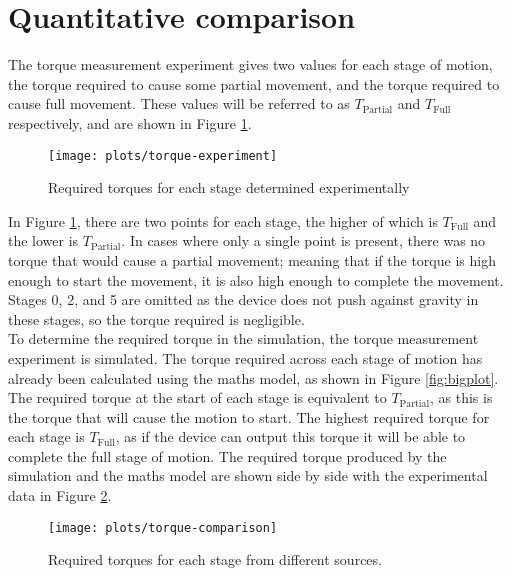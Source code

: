 \section{Quantitative comparison}

The torque measurement experiment gives two values for each stage of motion, the torque required to cause some partial movement, and the torque required to cause full movement. These values will be referred to as $T_\mathrm{Partial}$ and $T_\mathrm{Full}$ respectively, and are shown in Figure \ref{fig:torque-experiment}.

\begin{figure}[!h]
	\centering
	\texttt{[image: plots/torque-experiment]}
	\caption{Required torques for each stage determined experimentally}
	\label{fig:torque-experiment}
\end{figure}

In Figure \ref{fig:torque-experiment}, there are two points for each stage, the higher of which is $T_\mathrm{Full}$ and the lower is $T_\mathrm{Partial}$. In cases where only a single point is present, there was no torque that would cause a partial movement; meaning that if the torque is high enough to start the movement, it is also high enough to complete the movement. Stages 0, 2, and 5 are omitted as the device does not push against gravity in these stages, so the torque required is negligible.\\

To determine the required torque in the simulation, the torque measurement experiment is simulated. The torque required across each stage of motion has already been calculated using the maths model, as shown in Figure \ref{fig:bigplot}. The required torque at the start of each stage is equivalent to $T_\mathrm{Partial}$, as this is the torque that will cause the motion to start. The highest required torque for each stage is $T_\mathrm{Full}$, as if the device can output this torque it will be able to complete the full stage of motion. The required torque produced by the simulation and the maths model are shown side by side with the experimental data in Figure \ref{fig:torque-comparison}.\\

\begin{figure}[!h]
	\centering
	\texttt{[image: plots/torque-comparison]}
	\caption{Required torques for each stage from different sources.}
	\label{fig:torque-comparison}
\end{figure}

